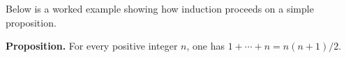 \documentclass[12pt]{article}
\begin{document}
Below is a worked example showing how induction proceeds on a simple proposition.

\textbf{Proposition.} For every positive integer $n$, one has $1 + \cdots + n = n(n+1)/2$.
\end{document}
